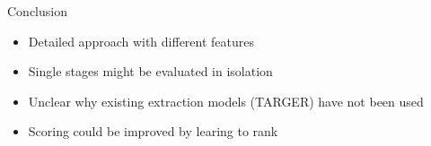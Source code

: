 \documentclass[english]{mlutalk}
\begin{document}
\begin{frame}{Conclusion}
  \begin{itemize}
    \item Detailed approach with different features
    \item Single stages might be evaluated in isolation
    \item Unclear why existing extraction models (TARGER) have not been used
    \item Scoring could be improved by learing to rank
  \end{itemize}
  \thankyou
\end{frame}

\appendix
\section{\appendixname}

\bibliographyframe
\end{document}
